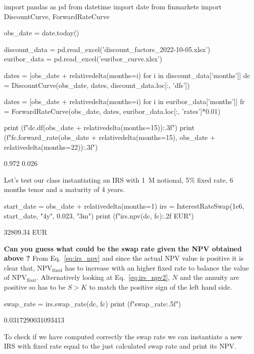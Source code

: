 \begin{ipython}
import pandas as pd
from datetime import date
from finmarkets import DiscountCurve, ForwardRateCurve

obs_date = date.today()

discount_data = pd.read_excel('discount_factors_2022-10-05.xlsx')
euribor_data = pd.read_excel('euribor_curve.xlsx')


dates = [obs_date + relativedelta(months=i) for i in discount_data['months']]
dc = DiscountCurve(obs_date, dates, discount_data.loc[:, 'dfs'])

dates = [obs_date + relativedelta(months=i) for i in euribor_data['months']]
fr = ForwardRateCurve(obs_date, dates, euribor_data.loc[:, 'rates']*0.01)

print (f"{dc.df(obs_date + relativedelta(months=15)):.3f}")
print (f"{fc.forward_rate(obs_date + relativedelta(months=15), 
	                      obs_date + relativedelta(months=22)):.3f}")
\end{ipython}
\begin{ioutput}
0.972
0.026
\end{ioutput}

Let's test our class instantiating an IRS with 1~M notional, 5\% fixed rate, 6 months tenor and a maturity of 4 years.

\begin{ipython}
start_date = obs_date + relativedelta(months=1)
irs = InterestRateSwap(1e6, start_date, "4y", 0.023, "3m")
print (f"{irs.npv(dc, fc):.2f} EUR")
\end{ipython}
\begin{ioutput}
32809.34 EUR
\end{ioutput}
\textbf{Can you guess what could be the \textbf{swap rate} given the NPV obtained above ?}
\noindent
From Eq.~\ref{eq:irs_npv} and since the actual NPV value is positive it is clear that, NPV$_{\textrm{fixed}}$ has to increase with an higher fixed rate to balance the value of NPV$_{\textrm{float}}$.
Alternatively looking at Eq.~\ref{eq:irs_npv2}, $N$ and the annuity are positive so has to be $S > K$ to match the positive sign of the left hand side.  

\begin{ipython}
swap_rate = irs.swap_rate(dc, fc)
print (f"{swap_rate:.5f}")
\end{ipython}
\begin{ioutput}
0.0317290031093413
\end{ioutput}
    
To check if we have computed correctly the swap rate we can instantiate a new IRS with fixed rate equal to the just calculated swap rate and print its NPV.

